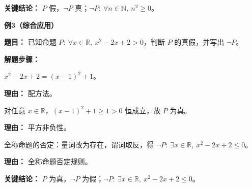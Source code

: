 \begin{examplebox}
	\textbf{\textcolor{CExample}{关键结论：}}
	$P$ 假，$\neg P$ 真；$\neg P:\ \forall n\in\mathbb{N},\ n^2\geq 0$。

	\medskip
	\textbf{\textcolor{CExample}{例3（综合应用）}}

	\textbf{\textcolor{CExample}{题目：}}
	已知命题 $P:\ \forall x\in\mathbb{R},\ x^2-2x+2>0$，判断 $P$ 的真假，并写出 $\neg P$。

	\textbf{\textcolor{CExample}{解题步骤：}}
	\begin{description}[style=nextline, leftmargin=2.8em, labelsep=0.5em, itemsep=0.45em]
		\item[\textbf{第一步（配方化简）：}] $x^2-2x+2=(x-1)^2+1$。
			\par\textbf{理由：} 配方法。
		\item[\textbf{第二步（判断真假）：}] 对任意 $x\in\mathbb{R}$，$(x-1)^2+1\geq 1>0$ 恒成立，故 $P$ 为真。
			\par\textbf{理由：} 平方非负性。
		\item[\textbf{第三步（应用否定）：}] 全称命题的否定：量词改为存在，谓词取反，得 $\neg P:\ \exists x\in\mathbb{R},\ x^2-2x+2\leq 0$。
			\par\textbf{理由：} 全称命题否定规则。
	\end{description}

	\textbf{\textcolor{CExample}{关键结论：}}
	$P$ 为真，$\neg P$ 为假；$\neg P:\ \exists x\in\mathbb{R},\ x^2-2x+2\leq 0$。
\end{examplebox}
